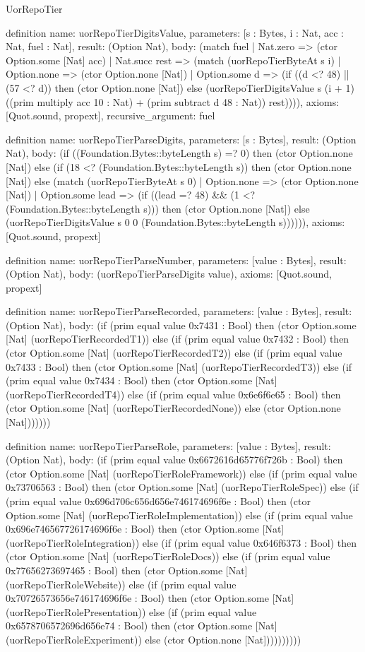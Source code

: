 \begin{lexlean}{UorRepoTier}
\begin{semanticmodule}
definition{
  name: uorRepoTierDigitsValue,
  parameters: [s : Bytes, i : Nat, acc : Nat, fuel : Nat],
  result: (Option Nat),
  body: (match fuel
    | Nat.zero => (ctor Option.some [Nat] acc)
    | Nat.succ rest => (match (uorRepoTierByteAt s i)
      | Option.none => (ctor Option.none [Nat])
      | Option.some d => (if ((d <? 48) || (57 <? d)) then (ctor Option.none [Nat]) else (uorRepoTierDigitsValue s (i + 1) ((prim multiply acc 10 : Nat) + (prim subtract d 48 : Nat)) rest)))),
  axioms: [Quot.sound, propext],
  recursive_argument: fuel
}

definition{
  name: uorRepoTierParseDigits,
  parameters: [s : Bytes],
  result: (Option Nat),
  body: (if ((Foundation.Bytes::byteLength s) =? 0) then (ctor Option.none [Nat]) else (if (18 <? (Foundation.Bytes::byteLength s)) then (ctor Option.none [Nat]) else (match (uorRepoTierByteAt s 0)
    | Option.none => (ctor Option.none [Nat])
    | Option.some lead => (if ((lead =? 48) && (1 <? (Foundation.Bytes::byteLength s))) then (ctor Option.none [Nat]) else (uorRepoTierDigitsValue s 0 0 (Foundation.Bytes::byteLength s)))))),
  axioms: [Quot.sound, propext]
}

definition{
  name: uorRepoTierParseNumber,
  parameters: [value : Bytes],
  result: (Option Nat),
  body: (uorRepoTierParseDigits value),
  axioms: [Quot.sound, propext]
}

definition{
  name: uorRepoTierParseRecorded,
  parameters: [value : Bytes],
  result: (Option Nat),
  body: (if (prim equal value 0x7431 : Bool) then (ctor Option.some [Nat] (uorRepoTierRecordedT1)) else (if (prim equal value 0x7432 : Bool) then (ctor Option.some [Nat] (uorRepoTierRecordedT2)) else (if (prim equal value 0x7433 : Bool) then (ctor Option.some [Nat] (uorRepoTierRecordedT3)) else (if (prim equal value 0x7434 : Bool) then (ctor Option.some [Nat] (uorRepoTierRecordedT4)) else (if (prim equal value 0x6e6f6e65 : Bool) then (ctor Option.some [Nat] (uorRepoTierRecordedNone)) else (ctor Option.none [Nat]))))))
}

definition{
  name: uorRepoTierParseRole,
  parameters: [value : Bytes],
  result: (Option Nat),
  body: (if (prim equal value 0x6672616d65776f726b : Bool) then (ctor Option.some [Nat] (uorRepoTierRoleFramework)) else (if (prim equal value 0x73706563 : Bool) then (ctor Option.some [Nat] (uorRepoTierRoleSpec)) else (if (prim equal value 0x696d706c656d656e746174696f6e : Bool) then (ctor Option.some [Nat] (uorRepoTierRoleImplementation)) else (if (prim equal value 0x696e746567726174696f6e : Bool) then (ctor Option.some [Nat] (uorRepoTierRoleIntegration)) else (if (prim equal value 0x646f6373 : Bool) then (ctor Option.some [Nat] (uorRepoTierRoleDocs)) else (if (prim equal value 0x77656273697465 : Bool) then (ctor Option.some [Nat] (uorRepoTierRoleWebsite)) else (if (prim equal value 0x70726573656e746174696f6e : Bool) then (ctor Option.some [Nat] (uorRepoTierRolePresentation)) else (if (prim equal value 0x6578706572696d656e74 : Bool) then (ctor Option.some [Nat] (uorRepoTierRoleExperiment)) else (ctor Option.none [Nat])))))))))
}


\end{semanticmodule}
\end{lexlean}

